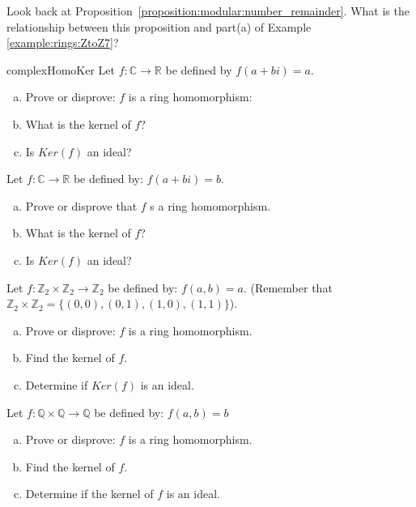 \begin{exercise}{}
Look back at Proposition~\ref{proposition:modular:number_remainder}.   What is the relationship between this proposition and part(a) of Example \ref{example:rings:ZtoZ7}?
\end{exercise}

\begin{exercise}{complexHomoKer}
Let $f:{\mathbb C}\rightarrow {\mathbb R}$ be defined by $f(a+bi)=a$.

\begin{enumerate}[(a)]
\item Prove or disprove: $f$ is a ring homomorphism:
\item What is the kernel of $f$?
\item Is $Ker(f)$ an ideal?
\end{enumerate}

\end{exercise}

\begin{exercise}{}
Let $f:{\mathbb C}\rightarrow {\mathbb R}$ be defined by: $f(a+bi)=b$.
\begin{enumerate}[(a)]
\item Prove or disprove that $f$ s a ring homomorphism.
\item What is the kernel of $f$?
\item Is $Ker(f)$ an ideal?
\end{enumerate}
\end{exercise}

\begin{exercise}{}
Let $f:{\mathbb Z}_2\times {\mathbb Z}_2\rightarrow {\mathbb Z}_2$ be defined by: $f(a,b)=a$.  (Remember that ${\mathbb Z}_2\times{\mathbb Z}_2=\{(0,0),(0,1),(1,0),(1,1)\}$).
\begin{enumerate}[(a)]
\item Prove or disprove: $f$ is a ring homomorphism.
\item Find the kernel of $f$.
\item Determine if $Ker(f)$ is an ideal.
\end{enumerate}
\end{exercise}
\begin{exercise}{}
Let $f:{\mathbb Q}\times {\mathbb Q}\rightarrow {\mathbb Q}$ be defined by: $f(a,b)=b$
\begin{enumerate}[(a)]
\item Prove or disprove: $f$ is a ring homomorphism.
\item Find the kernel of $f$.
\item Determine if the kernel of $f$ is an ideal.
\end{enumerate}
\end{exercise}

